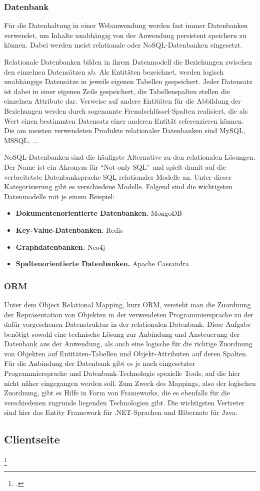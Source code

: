 \subsubsection{Datenbank}
Für die Datenhaltung in einer Webanwendung werden fast immer Datenbanken verwendet, um Inhalte unabhängig von der Anwendung persistent speichern zu können.
Dabei werden meist relationale oder \acs{NoSQL}-Datenbanken eingesetzt.

Relationale Datenbanken bilden in ihrem Datenmodell die Beziehungen zwischen den einzelnen Datensätzen ab.
Als Entitäten bezeichnet, werden logisch unabhängige Datensätze in jeweils eigenen Tabellen gespeichert. Jeder Datensatz ist dabei in einer eigenen Zeile gespeichert, die Tabellenspalten stellen die einzelnen Attribute dar.
Verweise auf andere Entitäten für die Abbildung der Beziehungen werden durch sogenannte Fremdschlüssel-Spalten realisiert, die als Wert einen bestimmten Datensatz einer anderen Entität referenzieren können.
Die am meisten verwendeten Produkte relationaler Datenbanken sind MySQL, MSSQL, ...%

\acs{NoSQL}-Datenbanken sind die häufigste Alternative zu den relationalen Lösungen. Der Name ist ein Akronym für \enquote{Not only SQL} und spielt damit auf die verbreitetste Datenbanksprache \acs{SQL} relationaler Modelle an.
Unter dieser Kategorisierung gibt es verschiedene Modelle. Folgend sind die wichtigsten Datenmodelle mit je einem Beispiel:

\begin{itemize}
\item\textbf{Dokumentenorientierte Datenbanken.} MongoDB
\item\textbf{Key-Value-Datenbanken.} Redis
\item\textbf{Graphdatenbanken.} Neo4j
\item\textbf{Spaltenorientierte Datenbanken.} Apache Cassandra
\end{itemize}

\subsubsection{ORM}
Unter dem Object Relational Mapping, kurz \acs{ORM}, versteht man die Zuordnung der Repräsentation von Objekten in der verwendeten Programmiersprache zu der dafür vorgesehenen Datenstruktur in der relationalen Datenbank.
Diese Aufgabe benötigt sowohl eine technische Lösung zur Anbindung und Ansteuerung der Datenbank aus der Anwendung, als auch eine logische für die richtige Zuordnung von Objekten auf Entitäten-Tabellen und Objekt-Attributen auf deren Spalten.
Für die Anbindung der Datenbank gibt es je nach eingesetzter Programmiersprache und Datenbank-Technologie spezielle Tools, auf die hier nicht näher eingegangen werden soll.
Zum Zweck des Mappings, also der logischen Zuordnung, gibt es Hilfe in Form von Frameworks, die es ebenfalls für die verschiedenen zugrunde liegenden Technologien gibt.
Die wichtigsten Vertreter sind hier das Entity Framework für .NET-Sprachen und Hibernate für Java.

\subsection{Clientseite}

\footcite[Vgl.][]{Thattil2016}
